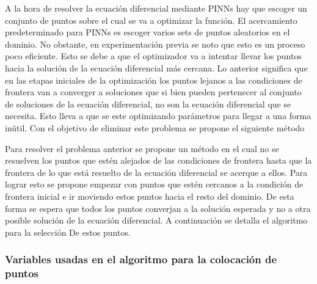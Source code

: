 \documentclass[11pt]{article}
\begin{document}
A la hora de resolver la ecuación diferencial mediante PINNs hay que
escoger un conjunto de puntos sobre el cual se va a optimizar la
función. El acercamiento predeterminado para PINNs es escoger varios
sets de puntos aleatorios en el dominio. No obstante, en experimentación
previa se noto que esto es un proceso poco eficiente. Esto se debe a que
el optimizador va a intentar llevar los puntos hacia la solución de la
ecuación diferencial más cercana. Lo anterior significa que en las
etapas iniciales de la optimización los puntos lejanos a las condiciones
de frontera van a converger a soluciones que si bien pueden pertenecer
al conjunto de soluciones de la ecuación diferencial, no son la ecuación
diferencial que se necesita. Esto lleva a que se este optimizando
parámetros para llegar a una forma inútil. Con el objetivo de eliminar
este problema se propone el siguiente método

Para resolver el problema anterior se propone un método en el cual no se
resuelven los puntos que estén alejados de las condiciones de frontera
hasta que la frontera de lo que está resuelto de la ecuación diferencial
se acerque a ellos. Para lograr esto se propone empezar con puntos que
estén cercanos a la condición de frontera inicial e ir moviendo estos
puntos hacia el resto del dominio. De esta forma se espera que todos los
puntos converjan a la solución esperada y no a otra posible solución de
la ecuación diferencial. A continuación se detalla el algoritmo para la
selección De estos puntos.

\hypertarget{variables-usadas-en-el-algoritmo-para-la-colocaciuxf3n-de-puntos}{%
\subsubsection{Variables usadas en el algoritmo para la colocación de
puntos}\label{variables-usadas-en-el-algoritmo-para-la-colocaciuxf3n-de-puntos}}
\end{document}
